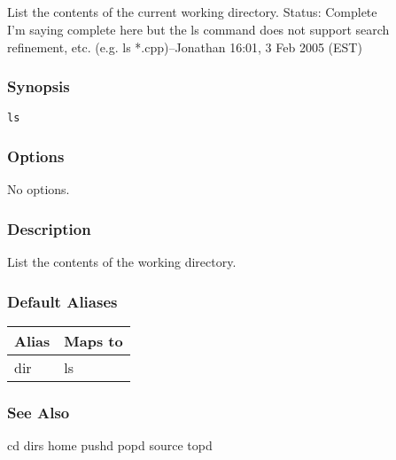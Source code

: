\subsection{}
\label{ls}
List the contents of the current working directory. 
 Status: Complete\\ 
I'm saying complete here but the ls command does not support search refinement, etc. (e.g. ls *.cpp)--Jonathan 16:01, 3 Feb 2005 (EST) 
\subsubsection*{Synopsis}
\begin{verbatim}
ls
\end{verbatim}
\subsubsection*{Options}
 No options. 
\subsubsection*{Description}
 List the contents of the working directory. 
\subsubsection*{Default Aliases}
\begin{tabular}{|l|l|}
\hline 
 Alias  & Maps to  \\
 \hline 
 dir  & ls  \\
 \hline 
\end{tabular}
\subsubsection*{See Also}
 cd dirs home pushd popd source topd
